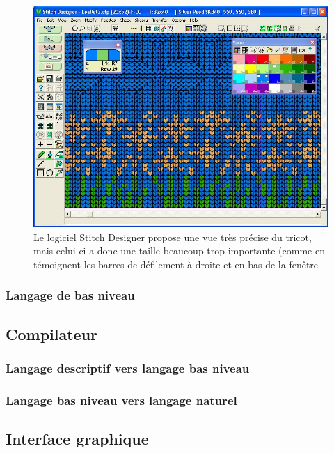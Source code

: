 \documentclass{article}
\begin{document}
\begin{figure}[!ht]
  \centering
  \includegraphics[scale=0.3]{../img/grid.jpg}
  \caption{Le logiciel Stitch Designer propose une vue très précise du tricot, mais celui-ci a donc une taille beaucoup trop importante (comme en témoignent les barres de défilement à droite et en bas de la fenêtre}
  \label{logiciel}
\end{figure}




\subsubsection{Langage de bas niveau}

\subsection{Compilateur}

\subsubsection{Langage descriptif vers langage bas niveau}

\subsubsection{Langage bas niveau vers langage naturel}




\subsection{Interface graphique}
\end{document}
